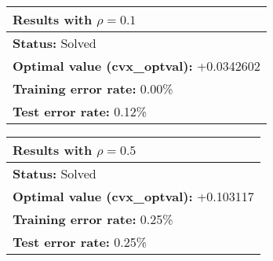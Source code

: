 \documentclass[a4paper,12pt]{report}
\begin{document}


\begin{minipage}[t]{0.48\textwidth}
    \centering
    \begin{tabular}{|p{6cm}|}
    \hline
    \rowcolor{blue!30}
    \textbf{Results with $\rho = 0.1$} \\
    \hline
    \textbf{Status:} Solved \\
    \textbf{Optimal value (cvx\_optval):} +0.0342602 \\
    \textbf{Training error rate:} 0.00\% \\
    \textbf{Test error rate:} 0.12\% \\
    \hline
    \end{tabular}
\end{minipage}%
\begin{minipage}[t]{0.48\textwidth}
    \centering
    \begin{tabular}{|p{6cm}|}
    \hline
    \rowcolor{blue!30}
    \textbf{Results with $\rho = 0.5$} \\
    \hline
    \textbf{Status:} Solved \\
    \textbf{Optimal value (cvx\_optval):} +0.103117 \\
    \textbf{Training error rate:} 0.25\% \\
    \textbf{Test error rate:} 0.25\% \\
    \hline
    \end{tabular}
\end{minipage}
\end{document}
